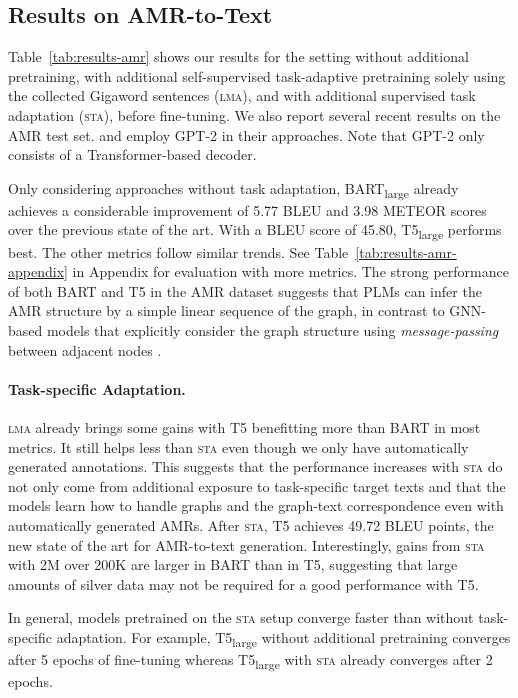 \documentclass[11pt]{article}
\begin{document}
\subsection{Results on AMR-to-Text}
\label{sec:amr}
Table~\ref{tab:results-amr} shows our results for the setting without additional pretraining, with additional self-supervised task-adaptive pretraining solely using the collected Gigaword sentences (\textsc{lma}), and with additional supervised task adaptation (\textsc{sta}), before fine-tuning. We also report several recent results on the AMR test set. \citet{mager2020gpttoo} and \citet{harkous2020text} employ GPT-2 in their approaches. Note that GPT-2 only consists of a Transformer-based decoder.

Only considering approaches without task adaptation, BART\textsubscript{large} already achieves a considerable improvement of 5.77 BLEU and 3.98 METEOR scores over the previous state of the art. With a BLEU score of 45.80, T5\textsubscript{large} performs best. The other metrics follow similar trends. See Table~\ref{tab:results-amr-appendix} in Appendix for evaluation with more metrics. The strong performance of both BART and T5 in the AMR dataset suggests that PLMs can infer the AMR structure by a simple linear sequence of the graph, in contrast to GNN-based models that explicitly consider the graph structure using \emph{message-passing} between adjacent nodes \cite{beck-etal-2018-acl2018}.



\paragraph{Task-specific Adaptation.}
\textsc{lma}
already brings some gains with T5 benefitting more than BART in most metrics.
It still helps less than \textsc{sta} even though we only have automatically generated annotations.
This suggests that the performance increases with \textsc{sta} do not only come from additional exposure to task-specific target texts and that the models learn how to handle graphs and the graph-text correspondence even with automatically generated AMRs. After \textsc{sta}, T5 achieves 49.72 BLEU points, the new state of the art for AMR-to-text generation. Interestingly, gains from \textsc{sta} with 2M over 200K are larger in BART than in T5, suggesting that large amounts of silver data may not be required for a good performance with T5. 

In general, models pretrained on the \textsc{sta} setup converge faster than without task-specific adaptation. For example, T5\textsubscript{large} without additional pretraining converges after 5 epochs of fine-tuning whereas T5\textsubscript{large} with \textsc{sta} already converges after 2 epochs.
\end{document}
